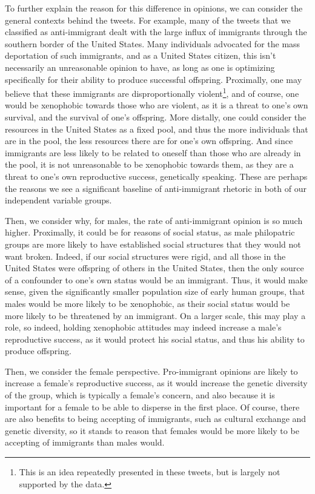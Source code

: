 \documentclass{article}
\begin{document}
To further explain the reason for this difference in opinions, we can consider the general contexts behind the tweets. For example, many of the tweets that we classified as anti-immigrant dealt with the large influx of immigrants through the southern border of the United States. Many individuals advocated for the mass deportation of such immigrants, and as a United States citizen, this isn't necessarily an unreasonable opinion to have, as long as one is optimizing specifically for their ability to produce successful offspring. Proximally, one may believe that these immigrants are disproportionally violent\footnote{This is an idea repeatedly presented in these tweets, but is largely not supported by the data.}, and of course, one would be xenophobic towards those who are violent, as it is a threat to one's own survival, and the survival of one's offspring. More distally, one could consider the resources in the United States as a fixed pool, and thus the more individuals that are in the pool, the less resources there are for one's own offspring. And since immigrants are less likely to be related to oneself than those who are already in the pool, it is not unreasonable to be xenophobic towards them, as they are a threat to one's own reproductive success, genetically speaking. These are perhaps the reasons we see a significant baseline of anti-immigrant rhetoric in both of our independent variable groups. 

Then, we consider why, for males, the rate of anti-immigrant opinion is so much higher. Proximally, it could be for reasons of social status, as male philopatric groups are more likely to have established social structures that they would not want broken. Indeed, if our social structures were rigid, and all those in the United States were offspring of others in the United States, then the only source of a confounder to one's own status would be an immigrant. Thus, it would make sense, given the significantly smaller population size of early human groups, that males would be more likely to be xenophobic, as their social status would be more likely to be threatened by an immigrant. On a larger scale, this may play a role, so indeed, holding xenophobic attitudes may indeed increase a male's reproductive success, as it would protect his social status, and thus his ability to produce offspring. 

Then, we consider the female perspective. Pro-immigrant opinions are likely to increase a female's reproductive success, as it would increase the genetic diversity of the group, which is typically a female's concern, and also because it is important for a female to be able to disperse in the first place. Of course, there are also benefits to being accepting of immigrants, such as cultural exchange and genetic diversity, so it stands to reason that females would be more likely to be accepting of immigrants than males would.
\end{document}

